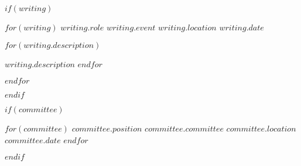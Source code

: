 \documentclass[11pt, a4paper]{awesome-cv}
\begin{document}

$if(writing)$

\begin{cventries}
  $for(writing)$
  \cventry
  {$writing.role$} %
  {$writing.event$} %
  {$writing.location$} %
  {$writing.date$} %
  {
  \begin{cvitems}
    $for(writing.description)$
    \item {$writing.description$}
    $endfor$
  \end{cvitems}
  }
  $endfor$
\end{cventries}
$endif$


$if(committee)$

\begin{cvhonors}
  $for(committee)$
  \cvhonor
  {$committee.position$} %
  {$committee.committee$} %
  {$committee.location$} %
  {$committee.date$} %
  $endfor$
\end{cvhonors}
$endif$
\end{document}
